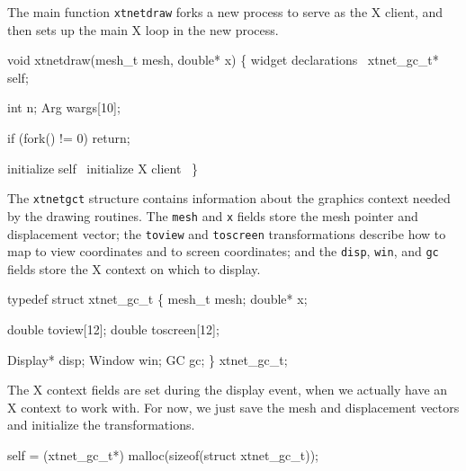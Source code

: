The main function {\tt{}xtnetdraw} forks a new process to serve
as the X client, and then sets up the main X loop in the new
process.

\nwenddocs{}\plusendmoddef
void xtnetdraw(mesh_t mesh, double* x)
\{
    \LA{}widget declarations~{\nwtagstyle{}}\RA{}
    xtnet_gc_t* self;

    int n;
    Arg wargs[10];

    if (fork() != 0)
        return;

    \LA{}initialize \code{}self\edoc{}~{\nwtagstyle{}}\RA{}
    \LA{}initialize X client~{\nwtagstyle{}}\RA{}
\}

\nwendcode{}\nwdocspar

The {\tt{}xtnet{}gc{}t} structure contains information about the
graphics context needed by the drawing routines.
The {\tt{}mesh} and {\tt{}x} fields store the mesh pointer and
displacement vector; the {\tt{}toview} and {\tt{}toscreen} transformations
describe how to map to view coordinates and to screen coordinates;
and the {\tt{}disp}, {\tt{}win}, and {\tt{}gc} fields store the X context
on which to display.

\nwenddocs{}\endmoddef
typedef struct xtnet_gc_t \{
    mesh_t mesh;
    double* x;

    double toview[12];
    double toscreen[12];

    Display* disp;
    Window   win;
    GC       gc;
\} xtnet_gc_t;

\nwendcode{}\nwdocspar

The X context fields are set during the display event, when we actually
have an X context to work with.  For now, we just save the mesh and
displacement vectors and initialize the transformations.

\nwenddocs{}\endmoddef
self = (xtnet_gc_t*) malloc(sizeof(struct xtnet_gc_t));

